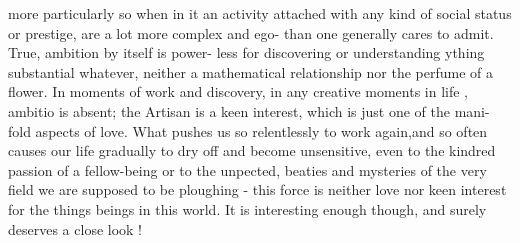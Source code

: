 more particularly so when in it  an activity attached with any kind of
social status or prestige, are a lot more complex and ego- than
one generally cares to admit.  True,  ambition by itself is  power-%
less for discovering or understanding  ything substantial whatever,
neither a mathematical relationship nor the perfume of a flower.  In 
moments of work and  discovery,  in any creative moments in life , ambitio
is absent; the Artisan is a keen interest,  which is just one of the mani-%
fold aspects of love.  What  pushes us so relentlessly to work again,and
so often causes our life  gradually to dry off and become unsensitive,
even to the kindred passion of a fellow-being\hand{,} or to the unpected,
beaties and mysteries of the very field we are supposed to be ploughing
-  this force is neither love nor keen interest for the things  beings
in this world.  It is interesting enough though,  and surely deserves
a close look !

